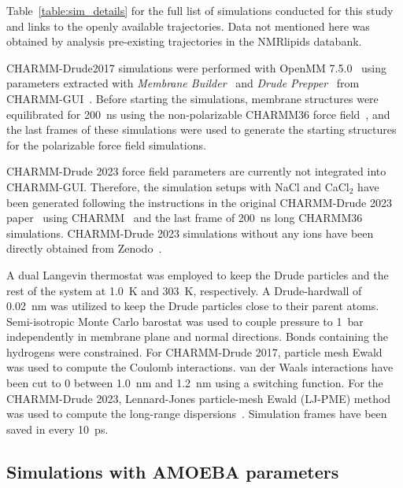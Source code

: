 \documentclass[journal=jacsat,manuscript=article,layout=singlecolumn]{achemso}
\begin{document}
Table~\ref{table:sim_details} for the full list of simulations conducted for this study and links to the openly available trajectories. Data not mentioned here was obtained by analysis pre-existing trajectories in the NMRlipids databank.


CHARMM-Drude2017 simulations were performed with OpenMM 7.5.0~\cite{eastman2017openmm} using parameters extracted with \textit{Membrane Builder}~\cite{wu2014charmm,jo2009charmm,jo2007automated,lee2018charmm} and \textit{Drude Prepper}~\cite{kognole2022charmm} from CHARMM-GUI~\cite{jo2008charmm,lee2016charmm}. Before starting the simulations, membrane structures were equilibrated for 200~ns using the non-polarizable CHARMM36 force field~\cite{klauda2010update}, and the last frames of these simulations were used to generate the starting structures for the polarizable force field simulations.

CHARMM-Drude 2023 force field parameters are currently not integrated into CHARMM-GUI. Therefore, the simulation setups with NaCl and CaCl$_{2}$ have been generated following the instructions in the original CHARMM-Drude 2023 paper~\cite{yu2023drude} using CHARMM~\cite{brooks2009charmm} and the last frame of 200~ns long CHARMM36 simulations. CHARMM-Drude 2023 simulations without any ions have been directly obtained from Zenodo~\cite{richard_m_venable_2023_7872447, richard_m_venable_2023_7871949}. 

A dual Langevin thermostat was employed to keep the Drude particles and the rest of the system at 1.0~K and 303~K, respectively. A Drude-hardwall of 0.02~nm was utilized to keep the Drude particles close to their parent atoms. Semi-isotropic Monte Carlo barostat was used to couple pressure to 1~bar independently in membrane plane and normal directions. %
Bonds containing the hydrogens were constrained. For CHARMM-Drude 2017, particle mesh Ewald was used to compute the Coulomb interactions. van der Waals interactions have been cut to 0 between 1.0~nm and 1.2~nm using a switching function. For the CHARMM-Drude 2023, Lennard-Jones particle-mesh Ewald (LJ-PME) method was used to compute the long-range dispersions~\cite{wennberg2013lennard}. Simulation frames have been saved in every 10~ps.


\subsection{Simulations with AMOEBA parameters}
\end{document}
